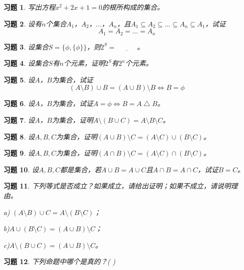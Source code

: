 \documentclass{article}
\begin{document}
\begin{CJK}{UTF8}{gbsn}
\newtheorem{Exercise}{习题}
\begin{Exercise}
  写出方程$x^2+2x+1=0$的根所构成的集合。
\end{Exercise}

\begin{Exercise}
  设有$n$个集合$A_1$，$A_2$，$\ldots$，$A_n$，且$A_1\subseteq A_2\subseteq \ldots \subseteq A_n \subseteq A_1$，试证
  \[A_1 = A_2 = \ldots = A_n\]
\end{Exercise}


\begin{Exercise}
  设集合$S=\{\phi, \{\phi\}\}$，则$2^S=\underline{\quad\quad\quad}$。
\end{Exercise}
\begin{Exercise}
  设集合$S$有$n$个元素，证明$2^S$有$2^n$个元素。
\end{Exercise}

\begin{Exercise}
  设$A$，$B$为集合，试证
  \[(A\setminus B)\cup B = (A\cup B)\setminus B \Leftrightarrow B = \phi\]
\end{Exercise}
\begin{Exercise}
  设$A$，$B$为集合，试证$A=\phi \Leftrightarrow B= A\bigtriangleup B$。
\end{Exercise}
\begin{Exercise}
  设$A$，$B$为集合，证明$A\setminus (B\cup C) = A\setminus B \setminus C$。
\end{Exercise}
\begin{Exercise}
  设$A,B,C$为集合，证明$(A\cup B)\setminus C = (A\setminus C) \cup (B\setminus C)$。
\end{Exercise}

\begin{Exercise}
  设$A,B,C$为集合，证明$(A\cap B)\setminus C = (A\setminus C) \cap (B\setminus C)$。
\end{Exercise}
\begin{Exercise}
  设$A,B,C$都是集合，若$A\cup B = A\cup C$且$A\cap B = A\cap C$，试证$B=C$。
\end{Exercise}
\begin{Exercise}
  下列等式是否成立？如果成立，请给出证明；如果不成立，请说明理由。

  a) $(A\setminus B)\cup C = A\setminus (B\setminus C)$；

  b)$A\cup(B\setminus C) = (A\cup B)\setminus C$；

  c)$A\setminus (B\cup C) = (A\cup B)\setminus C$。
\end{Exercise}
\begin{Exercise}
  下列命题中哪个是真的？(    )


\end{Exercise}
\end{CJK}
\end{document}
